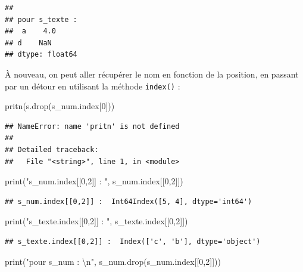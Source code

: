 \documentclass[12pt,]{book}
\newenvironment{Shaded}{\begin{snugshade}}{\end{snugshade}}
\newcommand{\DecValTok}[1]{\textcolor[rgb]{0.00,0.00,0.81}{#1}}
\newcommand{\CharTok}[1]{\textcolor[rgb]{0.31,0.60,0.02}{#1}}
\newcommand{\StringTok}[1]{\textcolor[rgb]{0.31,0.60,0.02}{#1}}
\newcommand{\BuiltInTok}[1]{#1}
\newcommand{\NormalTok}[1]{#1}
\numberwithin{equation}{section}
\numberwithin{countremarque}{section}
\begin{document}
\begin{lstlisting}
## 
## pour s_texte : 
##  a    4.0
## d    NaN
## dtype: float64
\end{lstlisting}

À nouveau, on peut aller récupérer le nom en fonction de la position, en
passant par un détour en utilisant la méthode \texttt{index()} :

\begin{Shaded}
\begin{Highlighting}[]
\NormalTok{pritn(s.drop(s_num.index[}\DecValTok{0}\NormalTok{]))}
\end{Highlighting}
\end{Shaded}

\begin{lstlisting}
## NameError: name 'pritn' is not defined
## 
## Detailed traceback: 
##   File "<string>", line 1, in <module>
\end{lstlisting}

\begin{Shaded}
\begin{Highlighting}[]
\BuiltInTok{print}\NormalTok{(}\StringTok{"s_num.index[[0,2]] : "}\NormalTok{, s_num.index[[}\DecValTok{0}\NormalTok{,}\DecValTok{2}\NormalTok{]])}
\end{Highlighting}
\end{Shaded}

\begin{lstlisting}
## s_num.index[[0,2]] :  Int64Index([5, 4], dtype='int64')
\end{lstlisting}

\begin{Shaded}
\begin{Highlighting}[]
\BuiltInTok{print}\NormalTok{(}\StringTok{"s_texte.index[[0,2]] : "}\NormalTok{, s_texte.index[[}\DecValTok{0}\NormalTok{,}\DecValTok{2}\NormalTok{]])}
\end{Highlighting}
\end{Shaded}

\begin{lstlisting}
## s_texte.index[[0,2]] :  Index(['c', 'b'], dtype='object')
\end{lstlisting}

\begin{Shaded}
\begin{Highlighting}[]
\BuiltInTok{print}\NormalTok{(}\StringTok{"pour s_num : }\CharTok{\textbackslash{}n}\StringTok{"}\NormalTok{, s_num.drop(s_num.index[[}\DecValTok{0}\NormalTok{,}\DecValTok{2}\NormalTok{]]))}
\end{Highlighting}
\end{Shaded}
\end{document}
